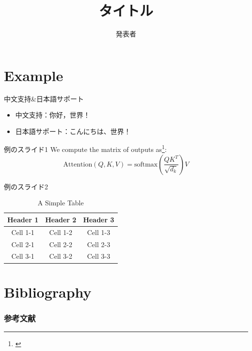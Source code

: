 \documentclass[11pt]{beamer}
\author[発表者]{発表者}
\title[短いタイトル]{タイトル}
\begin{document}
\begin{frame}
\titlepage
\end{frame}

\section{Example}

\begin{frame}{中文支持\&日本語サポート}
	\begin{itemize}
	  \item 中文支持：你好，世界！
	  \item 日本語サポート：こんにちは、世界！
	\end{itemize}
  \end{frame}

\begin{frame}{例のスライド1}
We compute the matrix of outputs as\footnote{\cite{vaswaniAttentionAllYou2023}}:
$$
	\mathrm{Attention}(Q, K, V) = \mathrm{softmax}(\frac{QK^T}{\sqrt{d_k}})V
$$
\end{frame}

\begin{frame}{例のスライド2}
	\begin{table}
	  \centering
	  \begin{tabular}{|c|c|c|}
		\hline
		\textbf{Header 1} & \textbf{Header 2} & \textbf{Header 3} \\
		\hline
		Cell 1-1 & Cell 1-2 & Cell 1-3 \\
		\hline
		Cell 2-1 & Cell 2-2 & Cell 2-3 \\
		\hline
		Cell 3-1 & Cell 3-2 & Cell 3-3 \\
		\hline
	  \end{tabular}
	  \caption{A Simple Table}
	\end{table}
\end{frame}

\section{Bibliography}

\begin{frame}[t,allowframebreaks]
\frametitle{参考文献}
\printbibliography
\end{frame}
\end{document}

